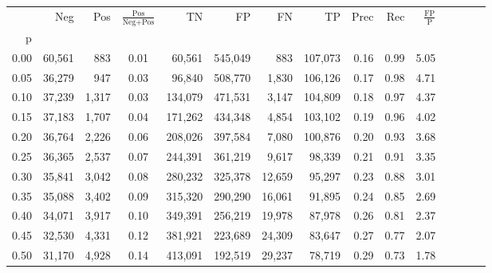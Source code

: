 \begin{tabular}{rrrcrrrrrrrrrrr}
\toprule
{} &     Neg &     Pos & $\frac{\text{Pos}}{\text{Neg}+\text{Pos}}$ &       TN &       FP &       FN &       TP &  Prec &   Rec & $\frac{\text{FP}}{\text{P}}$ \\
p    &         &         &                                            &          &          &          &          &       &       &                              \\
\midrule
0.00 &  60,561 &     883 &                                       0.01 &   60,561 &  545,049 &      883 &  107,073 &  0.16 &  0.99 &                         5.05 \\
0.05 &  36,279 &     947 &                                       0.03 &   96,840 &  508,770 &    1,830 &  106,126 &  0.17 &  0.98 &                         4.71 \\
0.10 &  37,239 &   1,317 &                                       0.03 &  134,079 &  471,531 &    3,147 &  104,809 &  0.18 &  0.97 &                         4.37 \\
0.15 &  37,183 &   1,707 &                                       0.04 &  171,262 &  434,348 &    4,854 &  103,102 &  0.19 &  0.96 &                         4.02 \\
0.20 &  36,764 &   2,226 &                                       0.06 &  208,026 &  397,584 &    7,080 &  100,876 &  0.20 &  0.93 &                         3.68 \\
0.25 &  36,365 &   2,537 &                                       0.07 &  244,391 &  361,219 &    9,617 &   98,339 &  0.21 &  0.91 &                         3.35 \\
0.30 &  35,841 &   3,042 &                                       0.08 &  280,232 &  325,378 &   12,659 &   95,297 &  0.23 &  0.88 &                         3.01 \\
0.35 &  35,088 &   3,402 &                                       0.09 &  315,320 &  290,290 &   16,061 &   91,895 &  0.24 &  0.85 &                         2.69 \\
0.40 &  34,071 &   3,917 &                                       0.10 &  349,391 &  256,219 &   19,978 &   87,978 &  0.26 &  0.81 &                         2.37 \\
0.45 &  32,530 &   4,331 &                                       0.12 &  381,921 &  223,689 &   24,309 &   83,647 &  0.27 &  0.77 &                         2.07 \\
0.50 &  31,170 &   4,928 &                                       0.14 &  413,091 &  192,519 &   29,237 &   78,719 &  0.29 &  0.73 &                         1.78 \\

\end{tabular}
